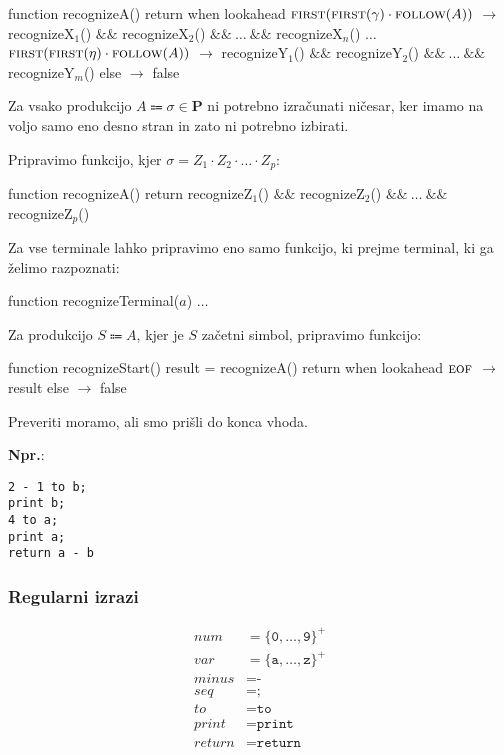 \documentclass{report}
\newcommand{\Ex}{\textbf{Npr.}:\ }
\newcommand{\Char}[1]{\texttt{#1}}
\newcommand{\Seq}{\cdot}
\newcommand{\KleenePlus}[1]{#1^+}
\newcommand{\Set}[1]{\symbf{#1}}
\newcommand{\FIRST}{\textsc{first}}
\newcommand{\FOLLOW}{\textsc{follow}}
\newcommand{\EOF}{\textsc{eof}}
\newcommand{\Productions}{\Set{P}}
\newcommand{\Arrow}{\Coloneq}
\newlength{\arrow}
\newcommand{\NT}[1]{{#1}}
\newcommand{\T}[1]{{#1}}
\begin{document}
\begin{algorithm}
  function recognizeA()
    return when lookahead
      $\FIRST(\FIRST(\gamma) \Seq \FOLLOW(\NT{A}))$ $\rightarrow$ recognizeX$_1$() $\&\&$ recognizeX$_2$() $\&\&\ \dots\ \&\&$ recognizeX$_n$()
      $\dots$
      $\FIRST(\FIRST(\eta) \Seq \FOLLOW(\NT{A}))$ $\rightarrow$ recognizeY$_1$() $\&\&$ recognizeY$_2$() $\&\&\ \dots\ \&\&$ recognizeY$_m$()
      else $\rightarrow$ false
\end{algorithm}

Za vsako produkcijo $\NT{A} \Arrow \sigma \in \Productions$ ni potrebno izračunati ničesar, ker imamo na voljo samo eno desno stran in zato ni potrebno izbirati.

Pripravimo funkcijo, kjer $\sigma = \NT{Z}_1 \Seq \NT{Z}_2 \Seq \dots \Seq \NT{Z}_p$:

\begin{algorithm}
  function recognizeA()
    return recognizeZ$_1$() $\&\&$ recognizeZ$_2$() $\&\&\ \dots\ \&\&$ recognizeZ$_p$()
\end{algorithm}

Za vse terminale lahko pripravimo eno samo funkcijo, ki prejme terminal, ki ga želimo razpoznati:
\begin{algorithm}
  function recognizeTerminal($a$)
    $\dots$
\end{algorithm}

Za produkcijo $\NT{S} \Arrow \NT{A}$, kjer je $\NT{S}$ začetni simbol, pripravimo funkcijo:
\begin{algorithm}
  function recognizeStart()
    result = recognizeA()
    return when lookahead
      $\EOF$ $\rightarrow$ result
      else $\rightarrow$ false
\end{algorithm}
Preveriti moramo, ali smo prišli do konca vhoda.

\Ex
\begin{lstlisting}
2 - 1 to b;
print b;
4 to a;
print a;
return a - b
\end{lstlisting}

\subsubsection*{Regularni izrazi}
\begin{equation*}
  \begin{aligned}
    \T{num} &= \KleenePlus{\{\Char{0}, \dots, \Char{9}\}}\\
    \T{var} &= \KleenePlus{\{\Char{a}, \dots, \Char{z}\}}\\
    \T{minus} &= \Char{-}\\
    \T{seq} &= \Char{;}\\
    \T{to} &= \Char{to}\\
    \T{print} &= \Char{print}\\
    \T{return} &= \Char{return}
  \end{aligned}
\end{equation*}
\end{document}
